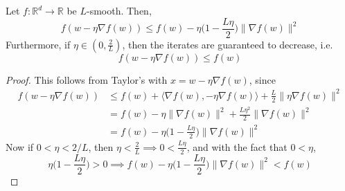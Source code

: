 	\begin{lemma}
		Let $f: \mathbb{R}^d \to \mathbb{R}$ be $L$-smooth. Then, 
		\begin{equation}
			f(w - \eta \nabla f(w)) \leq f(w) - \eta \big(1 - \frac{L \eta}{2} \big) \|\nabla f(w)\|^2
		\end{equation}
		Furthermore, if $\eta \in (0, \frac{2}{L})$, then the iterates are guaranteed to decrease, i.e. 
		\begin{equation}
			f(w - \eta \nabla f(w)) \leq f(w) 
		\end{equation}
	\end{lemma}
	\begin{proof}
	  This follows from Taylor's with $x = w - \eta \nabla f(w)$, since 
		\begin{align}
			f(w - \eta \nabla f(w)) & \leq f(w) + \langle \nabla f(w), - \eta \nabla f(w) \rangle + \frac{L}{2} \| \eta \nabla f(w)\|^2 \\ 
															& = f(w) - \eta \|\nabla f(w)\|^2 + \frac{L \eta^2}{2} \| \nabla f(w)\|^2 \\ 
															& = f(w) - \eta \big( 1 - \frac{L\eta}{2} \big) \|\nabla f(w)\|^2
		\end{align}
		Now if $0 < \eta < 2/L$, then $\eta < \frac{2}{L} \implies 0 < \frac{L\eta}{2}$, and with the fact that $0 < \eta$, 
		\begin{equation}
			\eta \big( 1 - \frac{L\eta}{2} \big) > 0 \implies f(w) - \eta \big( 1 - \frac{L\eta}{2} \big) \|\nabla f(w)\|^2 < f(w)
		\end{equation} 
	\end{proof}

